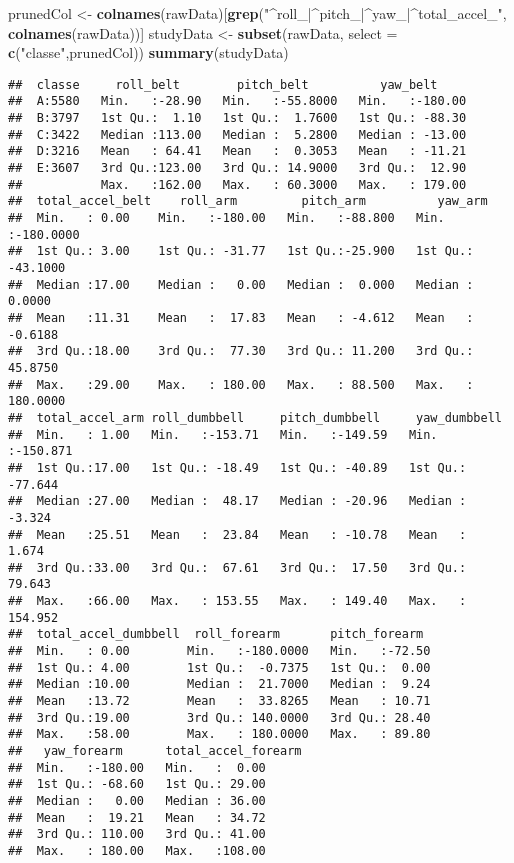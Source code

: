 \documentclass[]{article}
\newenvironment{Shaded}{\begin{snugshade}}{\end{snugshade}}
\newcommand{\KeywordTok}[1]{\textcolor[rgb]{0.13,0.29,0.53}{\textbf{{#1}}}}
\newcommand{\DataTypeTok}[1]{\textcolor[rgb]{0.13,0.29,0.53}{{#1}}}
\newcommand{\StringTok}[1]{\textcolor[rgb]{0.31,0.60,0.02}{{#1}}}
\newcommand{\NormalTok}[1]{{#1}}
\begin{document}
\begin{Shaded}
\begin{Highlighting}[]
\NormalTok{prunedCol <-}\StringTok{ }\KeywordTok{colnames}\NormalTok{(rawData)[}\KeywordTok{grep}\NormalTok{(}\StringTok{"^roll_|^pitch_|^yaw_|^total_accel_"}\NormalTok{,}
                                    \KeywordTok{colnames}\NormalTok{(rawData))]}
\NormalTok{studyData <-}\StringTok{ }\KeywordTok{subset}\NormalTok{(rawData, }\DataTypeTok{select =} \KeywordTok{c}\NormalTok{(}\StringTok{"classe"}\NormalTok{,prunedCol))}
\KeywordTok{summary}\NormalTok{(studyData)}
\end{Highlighting}
\end{Shaded}

\begin{verbatim}
##  classe     roll_belt        pitch_belt          yaw_belt      
##  A:5580   Min.   :-28.90   Min.   :-55.8000   Min.   :-180.00  
##  B:3797   1st Qu.:  1.10   1st Qu.:  1.7600   1st Qu.: -88.30  
##  C:3422   Median :113.00   Median :  5.2800   Median : -13.00  
##  D:3216   Mean   : 64.41   Mean   :  0.3053   Mean   : -11.21  
##  E:3607   3rd Qu.:123.00   3rd Qu.: 14.9000   3rd Qu.:  12.90  
##           Max.   :162.00   Max.   : 60.3000   Max.   : 179.00  
##  total_accel_belt    roll_arm         pitch_arm          yaw_arm         
##  Min.   : 0.00    Min.   :-180.00   Min.   :-88.800   Min.   :-180.0000  
##  1st Qu.: 3.00    1st Qu.: -31.77   1st Qu.:-25.900   1st Qu.: -43.1000  
##  Median :17.00    Median :   0.00   Median :  0.000   Median :   0.0000  
##  Mean   :11.31    Mean   :  17.83   Mean   : -4.612   Mean   :  -0.6188  
##  3rd Qu.:18.00    3rd Qu.:  77.30   3rd Qu.: 11.200   3rd Qu.:  45.8750  
##  Max.   :29.00    Max.   : 180.00   Max.   : 88.500   Max.   : 180.0000  
##  total_accel_arm roll_dumbbell     pitch_dumbbell     yaw_dumbbell     
##  Min.   : 1.00   Min.   :-153.71   Min.   :-149.59   Min.   :-150.871  
##  1st Qu.:17.00   1st Qu.: -18.49   1st Qu.: -40.89   1st Qu.: -77.644  
##  Median :27.00   Median :  48.17   Median : -20.96   Median :  -3.324  
##  Mean   :25.51   Mean   :  23.84   Mean   : -10.78   Mean   :   1.674  
##  3rd Qu.:33.00   3rd Qu.:  67.61   3rd Qu.:  17.50   3rd Qu.:  79.643  
##  Max.   :66.00   Max.   : 153.55   Max.   : 149.40   Max.   : 154.952  
##  total_accel_dumbbell  roll_forearm       pitch_forearm   
##  Min.   : 0.00        Min.   :-180.0000   Min.   :-72.50  
##  1st Qu.: 4.00        1st Qu.:  -0.7375   1st Qu.:  0.00  
##  Median :10.00        Median :  21.7000   Median :  9.24  
##  Mean   :13.72        Mean   :  33.8265   Mean   : 10.71  
##  3rd Qu.:19.00        3rd Qu.: 140.0000   3rd Qu.: 28.40  
##  Max.   :58.00        Max.   : 180.0000   Max.   : 89.80  
##   yaw_forearm      total_accel_forearm
##  Min.   :-180.00   Min.   :  0.00     
##  1st Qu.: -68.60   1st Qu.: 29.00     
##  Median :   0.00   Median : 36.00     
##  Mean   :  19.21   Mean   : 34.72     
##  3rd Qu.: 110.00   3rd Qu.: 41.00     
##  Max.   : 180.00   Max.   :108.00
\end{verbatim}
\end{document}
